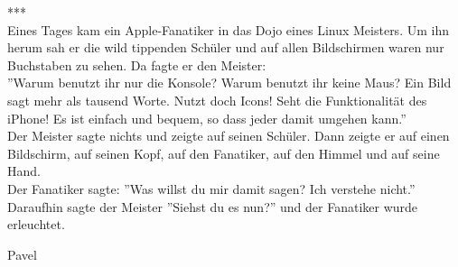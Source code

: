 ***\\


Eines Tages kam ein Apple-Fanatiker in das Dojo eines Linux Meisters.
Um ihn herum sah er die wild tippenden Schüler und auf allen Bildschirmen waren nur Buchstaben zu sehen.
Da fagte er den Meister:\\
\newline
''Warum benutzt ihr nur die Konsole? Warum benutzt ihr keine Maus?
Ein Bild sagt mehr als tausend Worte. Nutzt doch Icons!
Seht die Funktionalität des iPhone! Es ist einfach und bequem, so dass jeder damit umgehen kann.''\\
\newline
Der Meister sagte nichts und zeigte auf seinen Schüler. Dann zeigte er auf einen Bildschirm, auf seinen Kopf, auf den Fanatiker, auf den Himmel und auf seine Hand.\\
\newline
Der Fanatiker sagte: ''Was willst du mir damit sagen? Ich verstehe nicht.''\\
\newline
Daraufhin sagte der Meister ''Siehst du es nun?'' und der Fanatiker wurde erleuchtet.\\




\begin{flushright} Pavel \end{flushright} 
